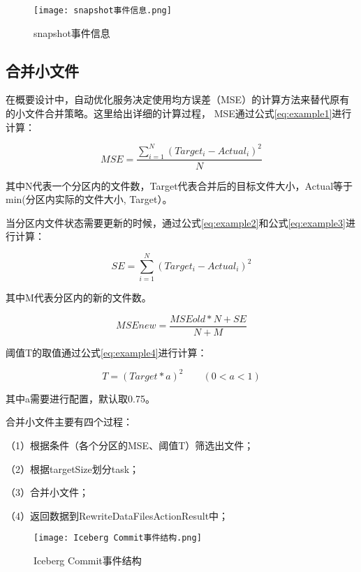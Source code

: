 \begin{figure}[H]
  \centering
  \texttt{[image: snapshot事件信息.png]}
  \caption{snapshot事件信息}
  \label{fig:snapshot事件信息}
\end{figure}

\subsection{合并小文件}

在概要设计中，自动优化服务决定使用均方误差（MSE）的计算方法来替代原有的小文件合并策略。这里给出详细的计算过程，
MSE通过公式\ref{eq:example1}进行计算：

\begin{equation}
  MSE=\frac {\sum_{i=1}^{N}{(Target_i - Actual_i)^2}} {N}
  \label{eq:example1}
\end{equation}

其中N代表一个分区内的文件数，Target代表合并后的目标文件大小，Actual等于min(分区内实际的文件大小, Target）。

当分区内文件状态需要更新的时候，通过公式\ref{eq:example2}和公式\ref{eq:example3}进行计算：

\begin{equation}
  SE=\sum_{i=1}^{N}{(Target_i - Actual_i)^2}
  \label{eq:example2}
\end{equation}

其中M代表分区内的新的文件数。

\begin{equation}
  MSEnew=\frac {MSEold*N+SE} {N+M}
  \label{eq:example3}
\end{equation}

阈值T的取值通过公式\ref{eq:example4}进行计算：

\begin{equation}
  T=(Target*a)^2 \qquad (0<a<1)
  \label{eq:example4}
\end{equation}

其中a需要进行配置，默认取0.75。

合并⼩⽂件主要有四个过程：

（1）根据条件（各个分区的MSE、阈值T）筛选出⽂件；

（2）根据targetSize划分task；

（3）合并⼩⽂件；

（4）返回数据到RewriteDataFilesActionResult中；

\begin{figure}[H]
  \centering
  \texttt{[image: Iceberg Commit事件结构.png]}
  \caption{Iceberg Commit事件结构}
  \label{fig:Commit事件结构}
\end{figure}

